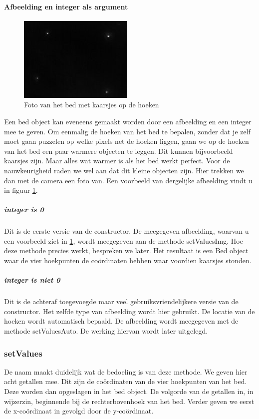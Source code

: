 \paragraph{Afbeelding en integer als argument}
\begin{figure}[hbp]
	\includegraphics[scale=0.75]{SeekCamBed}
	\caption{Foto van het bed met kaarsjes op de hoeken}
	\label{imgCBe}
\end{figure}
Een bed object kan eveneens gemaakt worden door een afbeelding en een integer mee te geven. Om eenmalig de hoeken van het bed te bepalen, zonder dat je zelf moet gaan puzzelen op welke pixels net de hoeken liggen, gaan we op de hoeken van het bed een paar warmere objecten  te leggen. Dit kunnen bijvoorbeeld kaarsjes zijn. Maar alles wat warmer is als het bed werkt perfect. Voor de nauwkeurigheid raden we wel aan dat dit kleine objecten zijn. Hier trekken we dan met de camera een foto van. Een voorbeeld van dergelijke afbeelding vindt u in figuur \ref{imgCBe}. 

\subparagraph{integer is 0}
Dit is de eerste versie van de constructor. De meegegeven afbeelding, waarvan u een voorbeeld ziet in \ref{imgCBe}, wordt meegegeven aan de methode setValuesImg. Hoe deze methode precies werkt, bespreken we later. Het resultaat is een Bed object waar de vier hoekpunten de co\"ordinaten hebben waar voordien kaarsjes stonden.

\subparagraph{integer is niet 0}
Dit is de achteraf toegevoegde maar veel gebruiksvriendelijkere versie van de constructor. Het zelfde type van afbeelding wordt hier gebruikt. De locatie van de hoeken wordt automatisch bepaald. De afbeelding wordt meegegeven met de methode setValuesAuto. De werking hiervan wordt later uitgelegd.

\subsubsection{setValues}
De naam maakt duidelijk wat de bedoeling is van deze methode. We geven hier acht getallen mee. Dit zijn de co\"ordinaten van de vier hoekpunten van het bed. Deze worden dan opgeslagen in het bed object. De volgorde van de getallen in, in wijzerzin, beginnende bij de rechterbovenhoek van het bed. Verder geven we eerst de x-co\"ordinaat in gevolgd door de y-co\"ordinaat.

